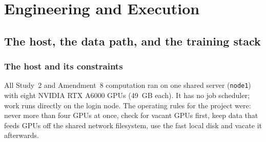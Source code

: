 \part{Engineering and Execution}

\chapter{The host, the data path, and the training stack}
\label{r:ch:host}

\section{The host and its constraints}

All Study~2 and Amendment~8 computation ran on one shared server (\texttt{node1}) with eight NVIDIA RTX A6000 GPUs
(49~GB each). It has no job scheduler; work runs directly on the login node. The operating rules for the project were:
never more than four GPUs at once, check for vacant GPUs first, keep data that feeds GPUs off the shared network
filesystem, use the fast local disk and vacate it afterwards.

